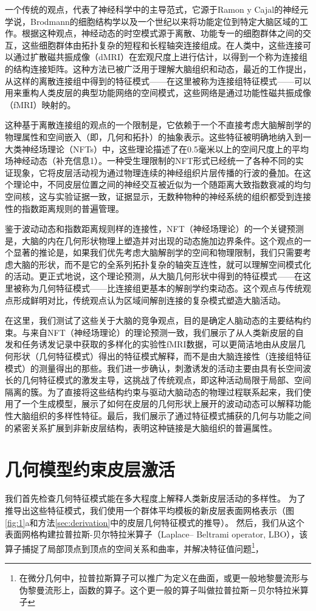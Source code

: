 \documentclass[lang=cn,a4paper,newtx]{elegantpaper}
\begin{document}
一个传统的观点，代表了神经科学中的主导范式，它源于Ramon y Cajal的神经元学说，Brodmann的细胞结构学以及一个世纪以来将功能定位到特定大脑区域的工作。根据这种观点，神经动态的时空模式源于离散、功能专一的细胞群体之间的交互，这些细胞群体由拓扑复杂的短程和长程轴突连接组成。在人类中，这些连接可以通过扩散磁共振成像（dMRI）在宏观尺度上进行估计，以得到一个称为连接组的结构连接矩阵。这种方法已被广泛用于理解大脑组织和动态，最近的工作提出，从这样的离散连接组中得到的特征模式——在这里被称为连接组特征模式——可以用来重构人类皮层的典型功能网络的空间模式，这些网络是通过功能性磁共振成像（fMRI）映射的。

这种基于离散连接组的观点的一个限制是，它依赖于一个不直接考虑大脑解剖学的物理属性和空间嵌入（即，几何和拓扑）的抽象表示。这些特征被明确地纳入到一大类神经场理论（NFTs）中，这些理论描述了在0.5毫米以上的空间尺度上的平均场神经动态（补充信息1）。一种受生理限制的NFT形式已经统一了各种不同的实证现象，它将皮层活动视为通过物理连续的神经组织片层传播的行波的叠加。在这个理论中，不同皮层位置之间的神经交互被近似为一个随距离大致指数衰减的均匀空间核，这与实验证据一致，证据显示，无数种物种的神经系统的组织都受到连接性的指数距离规则的普遍管理。

鉴于波动动态和指数距离规则样的连接性，NFT（神经场理论）的一个关键预测是，大脑的内在几何形状物理上塑造并对出现的动态施加边界条件。这个观点的一个显著的推论是，如果我们优先考虑大脑解剖学的空间和物理限制，我们只需要考虑大脑的形状，而不是它的全系列拓扑复杂的轴突互连性，就可以理解空间模式化的活动。更正式地说，这个理论预测，从大脑几何形状中得到的特征模式——在这里被称为几何特征模式——比连接组更基本的解剖学约束动态。这个观点与传统观点形成鲜明对比，传统观点认为区域间解剖连接的复杂模式塑造大脑活动。

在这里，我们测试了这些关于大脑的竞争观点，目的是确定人脑动态的主要结构约束。与来自NFT（神经场理论）的理论预测一致，我们展示了从人类新皮层的自发和任务诱发记录中获取的多样化的实验性fMRI数据，可以更简洁地由从皮层几何形状（几何特征模式）得出的特征模式解释，而不是由大脑连接性（连接组特征模式）的测量得出的那些。我们进一步确认，刺激诱发的活动主要由具有长空间波长的几何特征模式的激发主导，这挑战了传统观点，即这种活动局限于局部、空间隔离的簇。为了直接将这些结构约束与驱动大脑动态的物理过程联系起来，我们使用了一个生成模型，展示了如何在皮层的几何形状上展开的波动动态可以解释功能性大脑组织的多样性特征。最后，我们展示了通过特征模式捕获的几何与功能之间的紧密关系扩展到非新皮层结构，表明这种链接是大脑组织的普遍属性。

\section{几何模型约束皮层激活}
我们首先检查几何特征模式能在多大程度上解释人类新皮层活动的多样性。
为了推导出这些特征模式，我们使用一个群体平均模板的新皮层表面网格表示（图\ref{fig:1}a和方法\ref{sec:derivation}中的皮层几何特征模式的推导）。
然后，我们从这个表面网格构建拉普拉斯-贝尔特拉米算子（Laplace–
Beltrami operator, LBO），该算子捕捉了局部顶点到顶点的空间关系和曲率，并解决特征值问题\footnote{在微分几何中，拉普拉斯算子可以推广为定义在曲面，或更一般地黎曼流形与伪黎曼流形上，函数的算子。这个更一般的算子叫做拉普拉斯－贝尔特拉米算子}，
\end{document}
